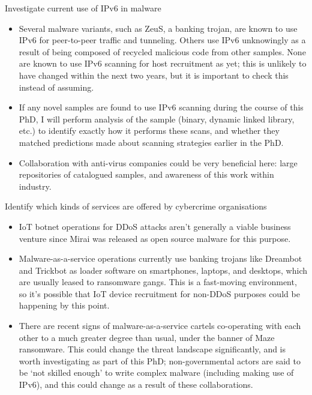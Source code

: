 \documentclass[10pt,sigconf]{acmart}
\begin{document}
Investigate current use of IPv6 in malware
\begin{itemize}
	\item Several malware variants, such as ZeuS, a banking trojan, are known to use IPv6 for peer-to-peer traffic and tunneling.
	Others use IPv6 unknowingly as a result of being composed of recycled malicious code from other samples.
	None are known to use IPv6 scanning for host recruitment as yet;
	this is unlikely to have changed within the next two years, but it is important to check this instead of assuming.
	\item If any novel samples are found to use IPv6 scanning during the course of this PhD, I will perform analysis of the sample (binary, dynamic linked library, etc.) to identify exactly how it performs these scans, and whether they matched predictions made about scanning strategies earlier in the PhD.
	\item Collaboration with anti-virus companies could be very beneficial here:
	large repositories of catalogued samples, and awareness of this work within industry.
\end{itemize}

Identify which kinds of services are offered by cybercrime organisations
\begin{itemize}
	\item IoT botnet operations for DDoS attacks aren't generally a viable business venture since Mirai was released as open source malware for this purpose.
	\item Malware-as-a-service operations currently use banking trojans like Dreambot and Trickbot as loader software on smartphones, laptops, and desktops, which are usually leased to ransomware gangs.
	This is a fast-moving environment, so it's possible that IoT device recruitment for non-DDoS purposes could be happening by this point.
	\item There are recent signs of malware-as-a-service cartels co-operating with each other to a much greater degree than usual, under the banner of Maze ransomware.
	This could change the threat landscape significantly, and is worth investigating as part of this PhD;
	non-governmental actors are said to be `not skilled enough' to write complex malware (including making use of IPv6), and this could change as a result of these collaborations.
\end{itemize}
\end{document}
